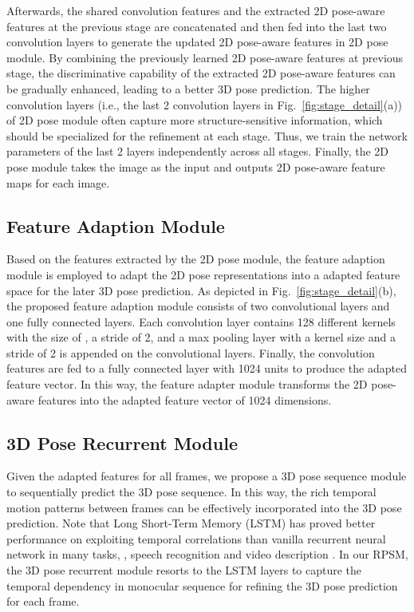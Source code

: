 \documentclass[10pt,twocolumn,letterpaper]{article}
\begin{document}
Afterwards, the shared convolution features and the extracted 2D pose-aware features at the previous stage are concatenated and then fed into the last two convolution layers to generate the updated 2D pose-aware features in 2D pose module. By combining the previously learned 2D pose-aware features at previous stage, the discriminative capability of the extracted 2D pose-aware features can be gradually enhanced, leading to a better 3D pose prediction. The higher convolution layers (i.e., the last 2 convolution layers in Fig.~\ref{fig:stage_detail}(a)) of 2D pose module often capture more structure-sensitive information, which should be specialized for the refinement at each stage. Thus, we train the network parameters of the last 2 layers independently across all stages. Finally, the 2D pose module takes the  image as the input and outputs  2D pose-aware feature maps for each image.

\subsection{Feature Adaption Module}
Based on the features extracted by the 2D pose module, the feature adaption module is employed to adapt the 2D pose representations into a adapted feature space for the later 3D pose prediction. As depicted in Fig.~\ref{fig:stage_detail}(b), the proposed feature adaption module consists of two convolutional layers and one fully connected layers. Each convolution layer contains 128 different kernels with the size of , a stride of 2, and a max pooling layer with a  kernel size and a stride of 2 is appended on the convolutional layers. Finally, the convolution features are fed to a fully connected layer with 1024 units to produce the adapted feature vector. In this way, the feature adapter module transforms the 2D pose-aware features into the adapted feature vector of 1024 dimensions.



\subsection{3D Pose Recurrent Module}
Given the adapted features for all frames, we propose a 3D pose sequence module to sequentially predict the 3D pose sequence. In this way, the rich temporal motion patterns between frames can be effectively incorporated into the 3D pose prediction. Note that Long Short-Term Memory (LSTM) \cite{Hochreiter1997Long} has proved better performance on exploiting temporal correlations than vanilla recurrent neural network in many tasks, \eg, speech recognition \cite{graves2014towards} and video description \cite{donahue2015long}. 
In our RPSM, the 3D pose recurrent module resorts to the LSTM layers to capture the temporal dependency in monocular sequence for refining the 3D pose prediction for each frame. 
\end{document}
